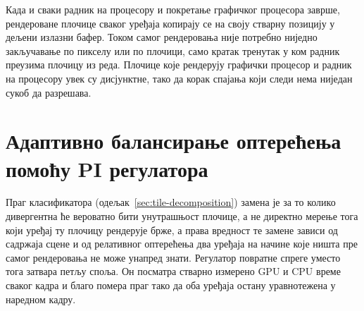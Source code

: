 \documentclass[serbian]{ftndiplomski}
\begin{document}
Када и сваки радник на процесору и покретање графичког процесора заврше, рендероване
плочице сваког уређаја копирају се на своју стварну позицију у дељени излазни бафер.
Током самог рендеровања није потребно ниједно закључавање по пикселу или по плочици,
само кратак тренутак у ком радник преузима плочицу из реда. Плочице које рендерују
графички процесор и радник на процесору увек су дисјунктне, тако да корак спајања
који следи нема ниједан сукоб да разрешава.

\section{Адаптивно балансирање оптерећења помоћу PI регулатора}
\label{sec:load-balancing}

Праг класификатора (одељак~\ref{sec:tile-decomposition}) замена је за то колико
дивергентна ће вероватно бити унутрашњост плочице, а не директно мерење тога који
уређај ту плочицу рендерује брже, а права вредност те замене зависи од садржаја сцене
и од релативног оптерећења два уређаја на начине које ништа пре самог рендеровања не
може унапред знати. Регулатор повратне спреге уместо тога затвара петљу споља. Он
посматра стварно измерено GPU и CPU време сваког кадра и благо помера праг тако да
оба уређаја остану уравнотежена у наредном кадру.
\end{document}
